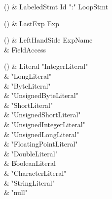 \begin{bbgrammarappendix}{3.9in}

() & LabeledStmt \label{prod:LabeledStmt}  \: Id \xcd":" LoopStmt  \\


\end{bbgrammarappendix}

\begin{bbgrammarappendix}{4.3in}

() & LastExp \label{prod:LastExp}  \: Exp  \\


\end{bbgrammarappendix}

\begin{bbgrammarappendix}{3.8in}

() & LeftHandSide \label{prod:LeftHandSide}  \: ExpName  \\

 &    \| FieldAccess \\

\end{bbgrammarappendix}

\begin{bbgrammarappendix}{4.3in}

() & Literal \label{prod:Literal}  \: \xcd"IntegerLiteral"   \\

 &    \| \xcd"LongLiteral"  \\
 &    \| \xcd"ByteLiteral" \\
 &    \| \xcd"UnsignedByteLiteral" \\
 &    \| \xcd"ShortLiteral" \\
 &    \| \xcd"UnsignedShortLiteral" \\
 &    \| \xcd"UnsignedIntegerLiteral"  \\
 &    \| \xcd"UnsignedLongLiteral"  \\
 &    \| \xcd"FloatingPointLiteral"  \\
 &    \| \xcd"DoubleLiteral"  \\
 &    \| BooleanLiteral \\
 &    \| \xcd"CharacterLiteral"  \\
 &    \| \xcd"StringLiteral"  \\
 &    \| \xcd"null" \\

\end{bbgrammarappendix}

